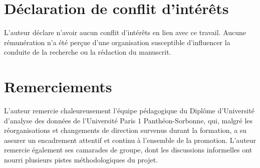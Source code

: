 \documentclass[ROIA,Unicode]{cedram}
\begin{document}
\section*{Déclaration de conflit d'intérêts}
L'auteur déclare n'avoir aucun conflit d'intérêts en lien avec ce travail. Aucune rémunération n'a été perçue d'une organisation susceptible d'influencer la conduite de la recherche ou la rédaction du manuscrit.

\section*{Remerciements}
L'auteur remercie chaleureusement l'équipe pédagogique du Diplôme d'Université d'analyse des données de l'Université Paris 1 Panthéon-Sorbonne, qui, malgré les réorganisations et changements de direction survenus durant la formation, a su assurer un encadrement attentif et continu à l'ensemble de la promotion. L'auteur remercie également ses camarades de groupe, dont les discussions informelles ont nourri plusieurs pistes méthodologiques du projet.


\end{document}
